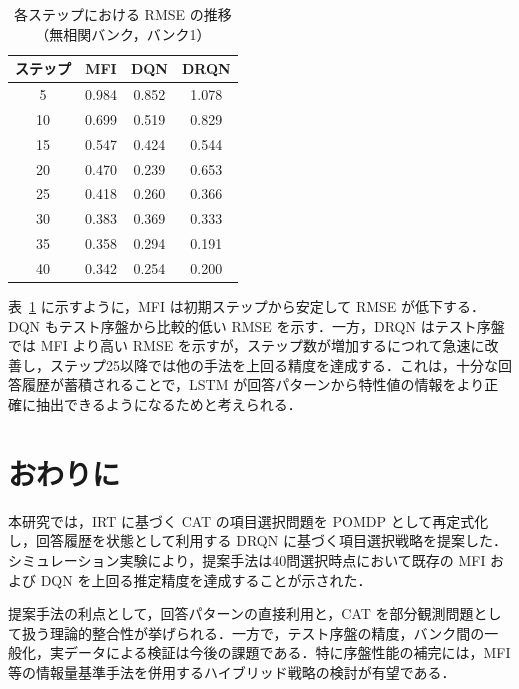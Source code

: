 \documentclass[dvipdfmx,a4j]{jarticle}
\begin{document}
\begin{table}[t]
\centering
\caption{各ステップにおける RMSE の推移（無相関バンク，バンク1）}
\label{tab:rmse_by_step}
\small
\begin{tabular}{cccc}
\toprule
ステップ & MFI & DQN & DRQN \\
\midrule
5  & 0.984 & 0.852 & 1.078 \\
10 & 0.699 & 0.519 & 0.829 \\
15 & 0.547 & 0.424 & 0.544 \\
20 & 0.470 & 0.239 & 0.653 \\
25 & 0.418 & 0.260 & 0.366 \\
30 & 0.383 & 0.369 & 0.333 \\
35 & 0.358 & 0.294 & 0.191 \\
40 & 0.342 & 0.254 & 0.200 \\
\bottomrule
\end{tabular}
\end{table}

表~\ref{tab:rmse_by_step} に示すように，MFI は初期ステップから安定して RMSE が低下する．DQN もテスト序盤から比較的低い RMSE を示す．一方，DRQN はテスト序盤では MFI より高い RMSE を示すが，ステップ数が増加するにつれて急速に改善し，ステップ25以降では他の手法を上回る精度を達成する．これは，十分な回答履歴が蓄積されることで，LSTM が回答パターンから特性値の情報をより正確に抽出できるようになるためと考えられる．

\section{おわりに}

本研究では，IRT に基づく CAT の項目選択問題を POMDP として再定式化し，回答履歴を状態として利用する DRQN に基づく項目選択戦略を提案した．シミュレーション実験により，提案手法は40問選択時点において既存の MFI および DQN を上回る推定精度を達成することが示された．

提案手法の利点として，回答パターンの直接利用と，CAT を部分観測問題として扱う理論的整合性が挙げられる．一方で，テスト序盤の精度，バンク間の一般化，実データによる検証は今後の課題である．特に序盤性能の補完には，MFI 等の情報量基準手法を併用するハイブリッド戦略の検討が有望である．
\end{document}
